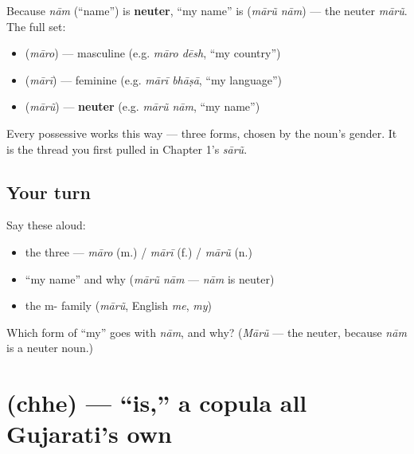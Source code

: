 \begin{grammarlens}[title={Grammar Lens: \textquotedblleft{}my\textquotedblright{} agrees in all three genders}]
Because \emph{nām} (\textquotedblleft{}name\textquotedblright{}) is \textbf{neuter}, \textquotedblleft{}my name\textquotedblright{} is \textbf{ } (\emph{mārũ nām}) — the neuter \emph{mārũ}. The full set:

\begin{itemize}
\raggedright
  \item \textbf{} (\emph{māro}) — masculine (e.g. \emph{māro dēsh}, \textquotedblleft{}my country\textquotedblright{})
  \item \textbf{} (\emph{mārī}) — feminine (e.g. \emph{mārī bhāṣā}, \textquotedblleft{}my language\textquotedblright{})
  \item \textbf{} (\emph{mārũ}) — \textbf{neuter} (e.g. \emph{mārũ nām}, \textquotedblleft{}my name\textquotedblright{})
\end{itemize}

Every possessive works this way — three forms, chosen by the noun's gender. It is the thread you first pulled in Chapter 1's \emph{sārũ}.
\end{grammarlens}

\subsection*{Your turn}
Say these aloud:

\begin{itemize}
\raggedright
  \item the three — \emph{māro} (m.) / \emph{mārī} (f.) / \emph{mārũ} (n.)
  \item \textquotedblleft{}my name\textquotedblright{} and why (\emph{mārũ nām} — \emph{nām} is neuter)
  \item the m- family (\emph{mārũ}, English \emph{me}, \emph{my})
\end{itemize}

\begin{tcolorbox}[breakable,colback=teal!4,colframe=teal!35!black,title={Before you move on}]
Which form of \textquotedblleft{}my\textquotedblright{} goes with \emph{nām}, and why? (\emph{Mārũ} — the neuter, because \emph{nām} is a neuter noun.)
\end{tcolorbox}
\section[\gu{છે}]{ (chhe) — \textquotedblleft{}is,\textquotedblright{} a copula all Gujarati's own}

